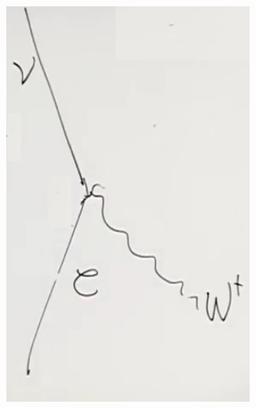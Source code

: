 \documentclass[]{article}
\begin{document}
\begin{figure}[H]
\begin{subfigure}[t]{0.2\textwidth}
		\includegraphics[width=0.9\textwidth]{2-5-W4}
	\end{subfigure}
\end{figure}
\end{document}
